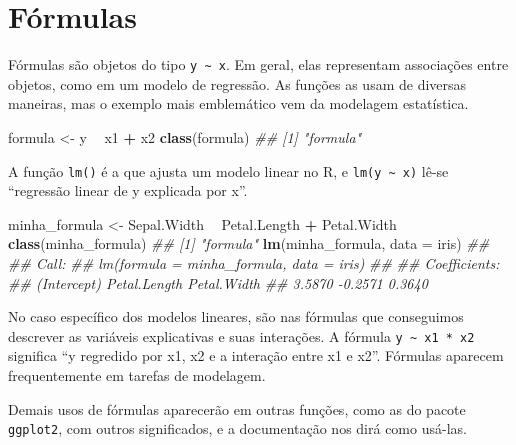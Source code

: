 \documentclass[
]{book}
\newenvironment{Shaded}{\begin{snugshade}}{\end{snugshade}}
\newcommand{\CommentTok}[1]{\textcolor[rgb]{0.56,0.35,0.01}{\textit{#1}}}
\newcommand{\DataTypeTok}[1]{\textcolor[rgb]{0.13,0.29,0.53}{#1}}
\newcommand{\KeywordTok}[1]{\textcolor[rgb]{0.13,0.29,0.53}{\textbf{#1}}}
\newcommand{\NormalTok}[1]{#1}
\newcommand{\OperatorTok}[1]{\textcolor[rgb]{0.81,0.36,0.00}{\textbf{#1}}}
\newcommand{\StringTok}[1]{\textcolor[rgb]{0.31,0.60,0.02}{#1}}
\begin{document}
\hypertarget{fuxf3rmulas}{%
\section{Fórmulas}\label{fuxf3rmulas}}

Fórmulas são objetos do tipo \texttt{y\ \textasciitilde{}\ x}. Em geral, elas representam associações entre objetos, como em um modelo de regressão. As funções as usam de diversas maneiras, mas o exemplo mais emblemático vem da modelagem estatística.

\begin{Shaded}
\begin{Highlighting}[]
\NormalTok{formula <-}\StringTok{ }\NormalTok{y }\OperatorTok{~}\StringTok{ }\NormalTok{x1 }\OperatorTok{+}\StringTok{ }\NormalTok{x2}
\KeywordTok{class}\NormalTok{(formula)}
\CommentTok{## [1] "formula"}
\end{Highlighting}
\end{Shaded}

A função \texttt{lm()} é a que ajusta um modelo linear no R, e \texttt{lm(y\ \textasciitilde{}\ x)} lê-se ``regressão linear de y explicada por x''.

\begin{Shaded}
\begin{Highlighting}[]
\NormalTok{minha_formula <-}\StringTok{ }\NormalTok{Sepal.Width }\OperatorTok{~}\StringTok{ }\NormalTok{Petal.Length }\OperatorTok{+}\StringTok{ }\NormalTok{Petal.Width}
\KeywordTok{class}\NormalTok{(minha_formula)}
\CommentTok{## [1] "formula"}
\KeywordTok{lm}\NormalTok{(minha_formula, }\DataTypeTok{data =}\NormalTok{ iris)}
\CommentTok{## }
\CommentTok{## Call:}
\CommentTok{## lm(formula = minha_formula, data = iris)}
\CommentTok{## }
\CommentTok{## Coefficients:}
\CommentTok{##  (Intercept)  Petal.Length   Petal.Width  }
\CommentTok{##       3.5870       -0.2571        0.3640}
\end{Highlighting}
\end{Shaded}

No caso específico dos modelos lineares, são nas fórmulas que conseguimos descrever as variáveis explicativas e suas interações. A fórmula \texttt{y\ \textasciitilde{}\ x1\ *\ x2} significa ``y regredido por x1, x2 e a interação entre x1 e x2''. Fórmulas aparecem frequentemente em tarefas de modelagem.

Demais usos de fórmulas aparecerão em outras funções, como as do pacote \texttt{ggplot2}, com outros significados, e a documentação nos dirá como usá-las.
\end{document}
